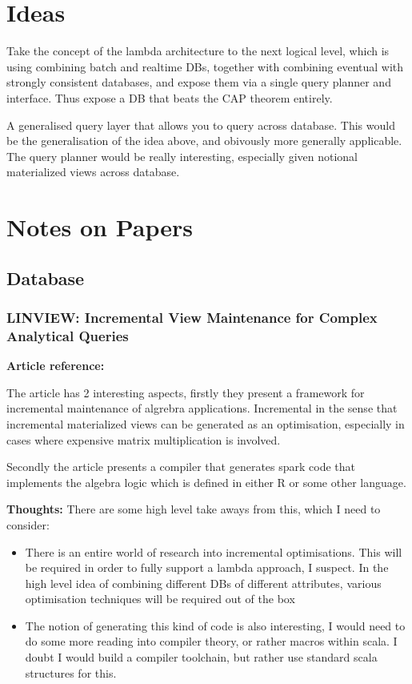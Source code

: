 \documentclass{article}
\begin{document}
\section{Ideas}

Take the concept of the lambda architecture to the next logical level, which is using combining batch and realtime DBs, together with combining eventual with strongly consistent databases, and expose them via a single query planner and interface. Thus expose a DB that beats the CAP theorem entirely. 

A generalised query layer that allows you to query across database. This would be the generalisation of the idea above, and obivously more generally applicable. The query planner would be really interesting, especially given notional materialized views across database.

\section{Notes on Papers}

\subsection{Database}

\subsubsection{LINVIEW: Incremental View Maintenance for Complex Analytical
               Queries}

\textbf{Article reference:} \cite{DBLP:journals/corr/NikolicEK14}

The article has 2 interesting aspects, firstly they present a framework for incremental maintenance of algrebra applications. Incremental in the sense that incremental materialized views can be generated as an optimisation, especially in cases where expensive matrix multiplication is involved. 

Secondly the article presents a compiler that generates spark code that implements the algebra logic which is defined in either R or some other language. 

\textbf{Thoughts:} There are some high level take aways from this, which I need to consider:
\begin{itemize}
  \item There is an entire world of research into incremental optimisations. This will be required in order to fully support a lambda approach, I suspect. In the high level idea of combining different DBs of different attributes, various optimisation techniques will be required out of the box
  \item The notion of generating this kind of code is also interesting, I would need to do some more reading into compiler theory, or rather macros within scala. I doubt I would build a compiler toolchain, but rather use standard scala structures for this. 
\end{itemize}
\end{document}
